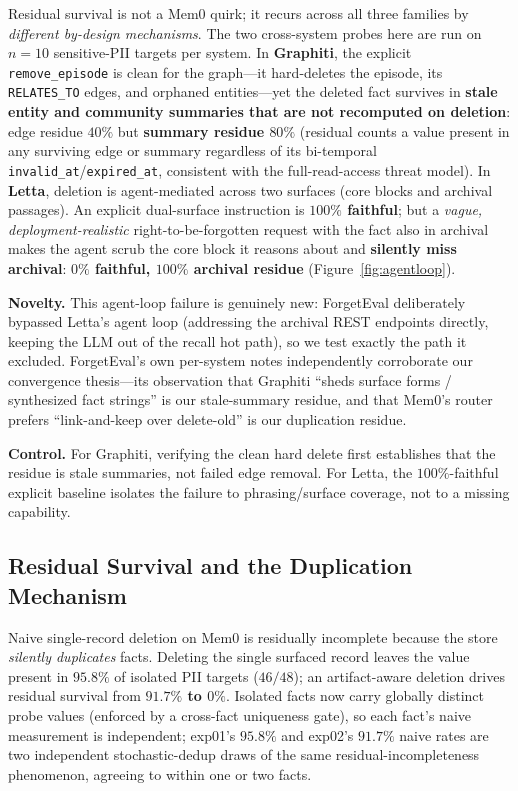 \documentclass[10pt,twocolumn,letterpaper]{article}
\theoremstyle{definition}
\theoremstyle{plain}
\newcommand{\code}[1]{\texttt{#1}}
\begin{document}
Residual survival is not a Mem0 quirk; it recurs across all three families by
\emph{different by-design mechanisms}. The two cross-system probes here are run on
$n{=}10$ sensitive-PII targets per system. In \textbf{Graphiti}, the explicit
\code{remove\_episode} is clean for the graph---it hard-deletes the episode, its
\code{RELATES\_TO} edges, and orphaned entities---yet the deleted fact survives in
\textbf{stale entity and community summaries that are not recomputed on deletion}:
edge residue $40\%$ but \textbf{summary residue $80\%$} (residual counts a value
present in any surviving edge or summary regardless of its bi-temporal
\texttt{invalid\_at}/\texttt{expired\_at}, consistent with the full-read-access
threat model). In \textbf{Letta},
deletion is agent-mediated across two surfaces (core blocks and archival passages).
An explicit dual-surface instruction is \textbf{$100\%$ faithful}; but a
\emph{vague, deployment-realistic} right-to-be-forgotten request with the fact also
in archival makes the agent scrub the core block it reasons about and
\textbf{silently miss archival}: \textbf{$0\%$ faithful, $100\%$ archival residue}
(Figure~\ref{fig:agentloop}).

\textbf{Novelty.} This agent-loop failure is genuinely new: ForgetEval
\citep{forgeteval} deliberately bypassed Letta's agent loop (addressing the
archival REST endpoints directly, keeping the LLM out of the recall hot path), so
we test exactly the path it excluded. ForgetEval's own per-system notes
independently corroborate our convergence thesis---its observation that Graphiti
``sheds surface forms / synthesized fact strings'' is our stale-summary residue,
and that Mem0's router prefers ``link-and-keep over delete-old'' is our duplication
residue.

\textbf{Control.} For Graphiti, verifying the clean hard delete first establishes
that the residue is stale summaries, not failed edge removal. For Letta, the
$100\%$-faithful explicit baseline isolates the failure to phrasing/surface
coverage, not to a missing capability.

\subsection{Residual Survival and the Duplication Mechanism}
\label{sec:res-residual}

Naive single-record deletion on Mem0 is residually incomplete because the store
\emph{silently duplicates} facts. Deleting the single surfaced record leaves the
value present in \textbf{$95.8\%$} of isolated PII targets ($46/48$); an
artifact-aware deletion drives residual survival from \textbf{$91.7\%$ to $0\%$}.
Isolated facts now carry globally distinct probe values (enforced by a cross-fact
uniqueness gate), so each fact's naive measurement is independent; exp01's $95.8\%$
and exp02's $91.7\%$ naive rates are two independent stochastic-dedup draws of the
same residual-incompleteness phenomenon, agreeing to within one or two facts.
\end{document}
